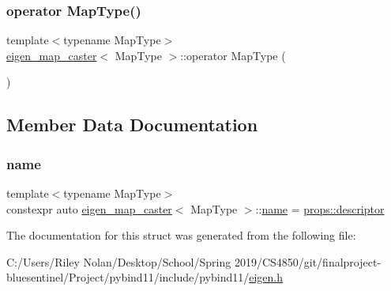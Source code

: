 \subsubsection{\texorpdfstring{operator MapType()}{operator MapType()}}
{\footnotesize\ttfamily template$<$typename Map\+Type$>$ \\
\mbox{\hyperlink{structeigen__map__caster}{eigen\+\_\+map\+\_\+caster}}$<$ Map\+Type $>$\+::operator Map\+Type (\begin{DoxyParamCaption}{ }\end{DoxyParamCaption})\hspace{0.3cm}{\ttfamily [delete]}}



\subsection{Member Data Documentation}
\mbox{\label{structeigen__map__caster_a893a5b3d3a5303bc3ab667023c1f17c9}} 
\subsubsection{\texorpdfstring{name}{name}}
{\footnotesize\ttfamily template$<$typename Map\+Type$>$ \\
constexpr auto \mbox{\hyperlink{structeigen__map__caster}{eigen\+\_\+map\+\_\+caster}}$<$ Map\+Type $>$\+::\mbox{\hyperlink{structname}{name}} = \mbox{\hyperlink{struct_eigen_props_aa3861d665ff4bf5df6b531008fe358ef}{props\+::descriptor}}\hspace{0.3cm}{\ttfamily [static]}}



The documentation for this struct was generated from the following file\+:\begin{DoxyCompactItemize}
\item 
C\+:/\+Users/\+Riley Nolan/\+Desktop/\+School/\+Spring 2019/\+C\+S4850/git/finalproject-\/bluesentinel/\+Project/pybind11/include/pybind11/\mbox{\hyperlink{eigen_8h}{eigen.\+h}}\end{DoxyCompactItemize}
